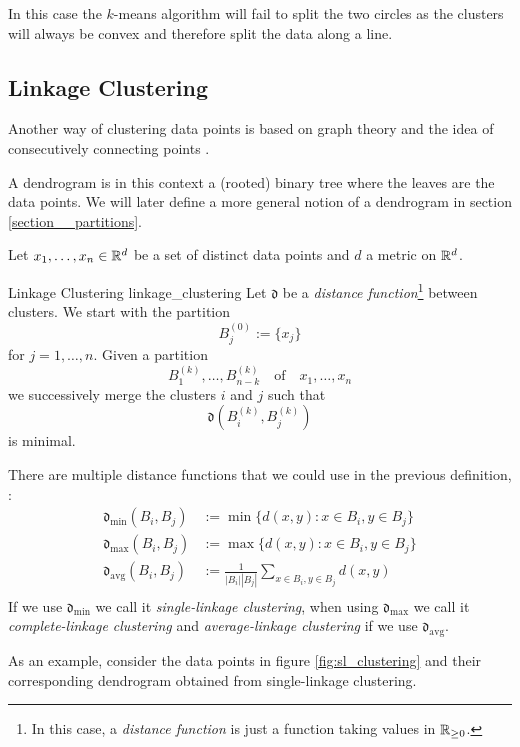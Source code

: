 In this case the $k$-means algorithm will fail to split the two circles as the clusters will always be convex and therefore split the data along a line.


\subsection{Linkage Clustering}
\label{section__linkage_clustering}
Another way of clustering data points is based on graph theory and the idea of consecutively connecting points \cite[Sec.~4.2.2]{Everitt2011}.

A dendrogram is in this context a (rooted) binary tree where the leaves are the data points. We will later define a more general notion of a dendrogram in section \ref{section__partitions}.



Let $x_1, \dots, x_n \in \mathbb R^d$ be a set of distinct data points and $d$ a metric on $\mathbb R^d$.
\begin{definition}{Linkage Clustering }{linkage_clustering}
Let $\mathfrak{d}$ be a \emph{distance function}\footnote{In this case, a \emph{distance function} is just a function taking values in $\mathbb R_{\geq0}$.} between clusters. We start with the partition
$$
B^{(0)}_j := \{x_j\}$$
for $j = 1, \dots, n$. Given a partition
$$
B^{(k)}_1, \dots, B^{(k)}_{n - k} \quad \text{of} \quad x_1, \dots, x_n
$$
we successively merge the clusters $i$ and $j$ such that
$$
\mathfrak{d}(B^{(k)}_i,B^{(k)}_j)
$$
is minimal.
\end{definition}

There are multiple distance functions that we could use in the previous definition, \eg :
\begin{align*}
\mathfrak{d}_\mathrm{min} (B_i, B_j) &:= \min\{d(x,y): x \in B_i, y \in B_j\}\\
\mathfrak{d}_\mathrm{max} (B_i, B_j) &:= \max\{d(x,y): x \in B_i, y \in B_j\}\\
\mathfrak{d}_\mathrm{avg}(B_i,B_j) &:= \frac{1}{|B_i||B_j|} \sum_{x \in B_i, y \in B_j} d(x,y)\\
\end{align*}
If we use $\mathfrak{d}_\mathrm{min}$ we call it \emph{single-linkage clustering}, when using $\mathfrak{d}_\mathrm{max}$ we call it \emph{complete-linkage clustering} and \emph{average-linkage clustering} if we use $\mathfrak{d}_\mathrm{avg}$.

As an example, consider the data points in figure \ref{fig:sl_clustering} and their corresponding dendrogram obtained from single-linkage clustering.


